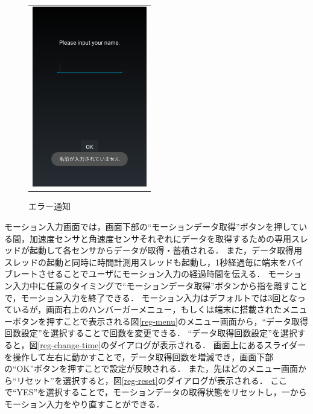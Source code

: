 \begin{figure}[hbtp]
\begin{tabular}{c}
\begin{minipage}{0.33\hsize}
      \caption{登録画面}
      \label{registration}
    \end{minipage}
    \begin{minipage}{0.33\hsize}
      \centering
      \includegraphics[bb=0 0 1080 1705, width=5cm]{Screenshots/reg-input-name-toast.pdf}
      \caption{エラー通知}
      \label{reg-input-name-toast}
    \end{minipage}
  \end{tabular}
\end{figure}

モーション入力画面では，画面下部の``モーションデータ取得''ボタンを押している間，加速度センサと角速度センサそれぞれにデータを取得するための専用スレッドが起動して各センサからデータが取得・蓄積される．
また，データ取得用スレッドの起動と同時に時間計測用スレッドも起動し，1秒経過毎に端末をバイブレートさせることでユーザにモーション入力の経過時間を伝える．
モーション入力中に任意のタイミングで``モーションデータ取得''ボタンから指を離すことで，モーション入力を終了できる．
モーション入力はデフォルトでは3回となっているが，画面右上のハンバーガーメニュー，もしくは端末に搭載されたメニューボタンを押すことで表示される図\ref{reg-menu}のメニュー画面から，``データ取得回数設定''を選択することで回数を変更できる．
``データ取得回数設定''を選択すると，図\ref{reg-change-time}のダイアログが表示される．
画面上にあるスライダーを操作して左右に動かすことで，データ取得回数を増減でき，画面下部の``OK''ボタンを押すことで設定が反映される．
また，先ほどのメニュー画面から``リセット''を選択すると，図\ref{reg-reset}のダイアログが表示される．
ここで``YES''を選択することで，モーションデータの取得状態をリセットし，一からモーション入力をやり直すことができる．

